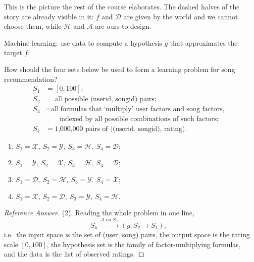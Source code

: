This is the picture the rest of the course elaborates. The dashed halves of the
story are already visible in it: \(f\) and \(\mathcal{D}\) are given by the
world and we cannot choose them, while \(\mathcal{H}\) and \(\mathcal{A}\) are
ours to design.

\begin{moral}
    Machine learning: use data to compute a hypothesis \(g\) that approximates
    the target \(f\).
\end{moral}

\begin{exercise}
    How should the four sets below be used to form a learning problem for song
    recommendation?
    \begin{align*}
        S_1 &= [0, 100];\\
        S_2 &= \text{all possible (userid, songid) pairs};\\
        S_3 &= \text{all formulas that `multiply' user factors and song
            factors,}\\
            &\qquad \text{indexed by all possible combinations of such
            factors};\\
        S_4 &= \text{1,000,000 pairs of ((userid, songid), rating)}.
    \end{align*}
    \begin{enumerate}[(1)]
        \item \(S_1 = \mathcal{X},\ S_2 = \mathcal{Y},\ S_3 = \mathcal{H},\
            S_4 = \mathcal{D}\);
        \item \(S_1 = \mathcal{Y},\ S_2 = \mathcal{X},\ S_3 = \mathcal{H},\
            S_4 = \mathcal{D}\);
        \item \(S_1 = \mathcal{D},\ S_2 = \mathcal{H},\ S_3 = \mathcal{Y},\
            S_4 = \mathcal{X}\);
        \item \(S_1 = \mathcal{X},\ S_2 = \mathcal{D},\ S_3 = \mathcal{Y},\
            S_4 = \mathcal{H}\).
    \end{enumerate}
\end{exercise}

\begin{proof}[Reference Answer]
    (2). Reading the whole problem in one line,
    \[
        S_4 \xrightarrow{\ \mathcal{A} \text{ on } S_3\ }
        \left( g\colon S_2 \to S_1 \right),
    \]
    i.e.\ the input space is the set of (user, song) pairs, the output space is
    the rating scale \([0,100]\), the hypothesis set is the family of
    factor-multiplying formulas, and the data is the list of observed ratings.
\end{proof}

